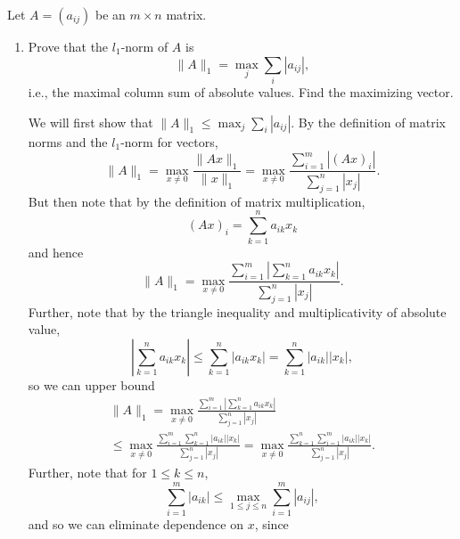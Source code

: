 \documentclass{../../../kin_math}
\begin{document}
\begin{questions}
  \newpage
  \question Let $A = (a_{ij})$ be an $m \times n$ matrix.
  \begin{enumerate}
    \item Prove that the $l_1$-norm of $A$ is
    \begin{equation*}
      \lVert A \rVert_1 = \max_j \sum_i |a_{ij}|,
    \end{equation*}
    i.e., the maximal column sum of absolute values. Find the maximizing vector.
    \begin{solution}
      We will first show that $\lVert A \rVert_1 \leq \max_j \sum_i |a_{ij}|$. By the definition of matrix norms and the $l_1$-norm for vectors,
      \begin{equation*}
        \lVert A \rVert_1 = \max_{x \neq 0} \frac{\lVert Ax \rVert_1}{\lVert x \rVert_1} = \max_{x \neq 0} \frac{\sum_{i = 1}^m |(Ax)_i|}{\sum_{j = 1}^n |x_j|}.
      \end{equation*}
      But then note that by the definition of matrix multiplication,
      \begin{equation*}
        (Ax)_i = \sum_{k = 1}^n a_{ik}x_k
      \end{equation*}
      and hence
      \begin{equation*}
        \lVert A \rVert_1 = \max_{x \neq 0} \frac{\sum_{i = 1}^m \left|\sum_{k = 1}^n a_{ik}x_k\right|}{\sum_{j = 1}^n |x_j|}.
      \end{equation*}
      Further, note that by the triangle inequality and multiplicativity of absolute value,
      \begin{equation*}
        \left|\sum_{k = 1}^n a_{ik}x_k\right| \leq \sum_{k = 1}^n |a_{ik}x_k| = \sum_{k = 1}^n |a_{ik}||x_k|,
      \end{equation*}
      so we can upper bound
      \begin{multline*}
        \lVert A \rVert_1 = \max_{x \neq 0} \frac{\sum_{i = 1}^m \left|\sum_{k = 1}^n a_{ik}x_k\right|}{\sum_{j = 1}^n |x_j|} \\
        \leq \max_{x \neq 0} \frac{\sum_{i = 1}^m \sum_{k = 1}^n |a_{ik}||x_k|}{\sum_{j = 1}^n |x_j|} = \max_{x \neq 0} \frac{\sum_{k = 1}^n \sum_{i = 1}^m |a_{ik}||x_k|}{\sum_{j = 1}^n |x_j|}.
      \end{multline*}
      Further, note that for $1 \leq k \leq n$,
      \begin{equation*}
        \sum_{i = 1}^m |a_{ik}| \leq \max_{1 \leq j \leq n} \sum_{i = 1}^m |a_{ij}|,
      \end{equation*}
      and so we can eliminate dependence on $x$, since

\end{solution}
\end{enumerate}
\end{questions}
\end{document}
